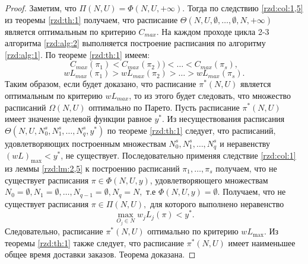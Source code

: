 \begin{proof}
Заметим, что $\Pi(N,U) = \Phi(N,U, +\infty)$. Тогда по следствию \ref{rzd:col:1,5} из теоремы \ref{rzd:th:1} получаем, что расписание $\Theta(N,U,\emptyset, \dots,\emptyset, N, +\infty)$ является оптимальным по критерию $C_{max}$. На каждом проходе цикла 2-3 алгоритма \ref{rzd:alg:2} выполняется построение расписания по алгоритму \ref{rzd:alg:1}. По теореме \ref{rzd:th:1} имеем:
$$C_{max}(\pi_1) < C_{max}(\pi_2)) < \dots < C_{max}(\pi_s),$$
$$wL_{max}(\pi_1) > wL_{max}(\pi_2) > \dots > wL_{max}(\pi_s).$$
Таким образом, если будет доказано, что расписание $\pi^{*}(N,U)$ является оптимальным по критерию $wL_{max}$, то из этого будет следовать, что множество расписаний $\Omega(N,U)$ оптимально по Парето.
Пусть расписание $\pi^{*}(N,U)$ имеет значение целевой функции равное $y^{*}$. Из несуществования расписания $\Theta(N,U,N_0^s, N_1^s, \dots, N_q^s, y^{*})$ по теореме \ref{rzd:th:1} следует, что расписаний, удовлетворяющих построенным множествам $N_0^s, N_1^s, \dots, N_q^s$ и неравенству $(wL)_{\max}<y^{*}$, не существует. Последовательно применяя следствие \ref{rzd:col:1} из леммы \ref{rzd:lm:2,5} к построению расписаний $\pi_1, \dots, \pi_s$ получаем, что не существует расписания $\pi \in \Phi(N,U,y)$, удовлетворяющего множествам $N_0 = \emptyset, N_1 = \emptyset, \dots, N_{q-1} = \emptyset, N_q = N,$ т.е $\Phi(N,U,y) = \emptyset$.
Получаем, что не существует расписания $\pi \in \Pi(N,U),$
 для которого выполнено неравенство
 $$\max\limits_{O_j \in N} w_j L_j(\pi) < y^{*}.$$
 Следовательно, расписание $\pi^{*}(N,U)$ оптимально по критерию $wL_{\max}$. Из теоремы \ref{rzd:th:1} также следует, что расписание $\pi^{*}(N,U)$ имеет наименьшее общее время доставки заказов.
 Теорема доказана.
 \end{proof}

